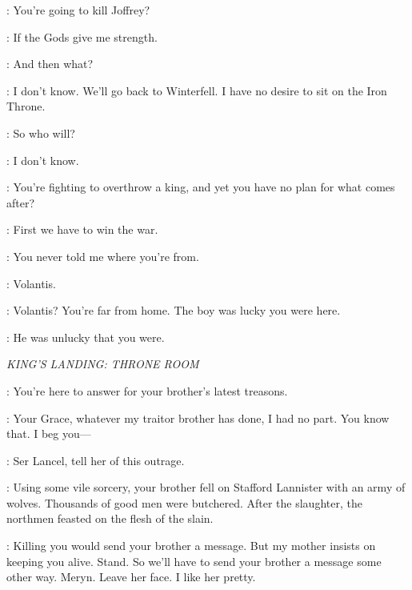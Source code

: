 \TALISA: You're going to kill Joffrey? 

\ROBB: If the Gods give me strength. 

\TALISA: And then what? 

\ROBB: I don't know. We'll go back to Winterfell. I have no desire to sit on the Iron Throne. 

\TALISA: So who will? 

\ROBB: I don't know. 

\TALISA: You're fighting to overthrow a king, and yet you have no plan for what comes after? 

\ROBB: First we have to win the war. 


\ROBB: You never told me where you're from. 

\TALISA: Volantis. 

\ROBB: Volantis? You're far from home. The boy was lucky you were here. 

\TALISA: He was unlucky that you were. 



\scene

\textit{KING'S LANDING: THRONE ROOM} 


\JOFFREY: You're here to answer for your brother's latest treasons. 

\SANSA: Your Grace, whatever my traitor brother has done, I had no part. You know that. I beg you---  

\JOFFREY: Ser Lancel, tell her of this outrage. 


\LANCEL: Using some vile sorcery, your brother fell on Stafford Lannister with an army of wolves. Thousands of good men were butchered. After the slaughter, the northmen feasted on the flesh of the slain. 


\JOFFREY: Killing you would send your brother a message. But my mother insists on keeping you alive. Stand. So we'll have to send your brother a message some other way. Meryn. Leave her face. I like her pretty. 


